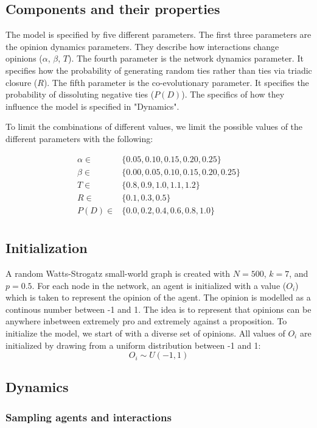 \documentclass{article}
\begin{document}
\subsection{Components and their properties}
The model is specified by five different parameters. 
The first three parameters are the opinion dynamics parameters. They describe how interactions change opinions ($\alpha$, $\beta$, $T$). 
The fourth parameter is the network dynamics parameter. It specifies how the probability of generating random ties rather than ties via triadic closure ($R$).
The fifth parameter is the co-evolutionary parameter. It specifies the probability of dissoluting negative ties ($P(D)$).
The specifics of how they influence the model is specified in "Dynamics".  

To limit the combinations of different values, we limit the possible values of the different parameters with the following:


\begin{align*}
    \alpha \in & \{0.05, 0.10, 0.15, 0.20, 0.25\} \\
    \beta \in & \{0.00, 0.05, 0.10, 0.15, 0.20, 0.25\}\\
    T \in & \{0.8, 0.9, 1.0, 1.1, 1.2\}\\
    R \in & \{0.1, 0.3, 0.5\} \\
    P(D) \in & \{0.0, 0.2, 0.4, 0.6, 0.8, 1.0\}\\
\end{align*}


\subsection{Initialization}
A random Watts-Strogatz small-world graph is created 
with $N=500$, $k=7$, and $p=0.5$. For each node in the network,
an agent is initialized with a value ($O_i$) which is taken to represent the opinion of the agent. The opinion is modelled as a continous number between -1 and 1. 
The idea is to represent that opinions can be anywhere inbetween extremely pro and extremely against a proposition.
To initialize the model, we start of with a diverse set of opinions. All values of $O_i$ are initialized by drawing from a uniform distribution between -1 and 1: 
$$O_i \sim U(-1, 1)$$

\subsection{Dynamics}

\subsubsection{Sampling agents and interactions}
\end{document}
